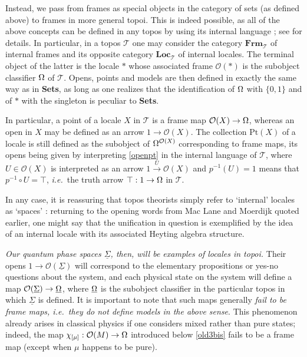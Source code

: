 \documentclass[11pt]{article}
\newcommand{\Sets}{\mbox{\textbf{Sets}}}
\newcommand{\raw}{\rightarrow} \newcommand{\rat}{\mapsto}
\newcommand{\inv}{^{-1}}
\newcommand{\er}{\eqref}
\newcommand{\ch}{\chi} \newcommand{\ps}{\psi} \newcommand{\Ps}{\Psi}
\newcommand{\CO}{{\mathcal O}} \newcommand{\CP}{{\mathcal P}}
\newcommand{\CT}{{\mathcal T}} \newcommand{\CV}{{\mathcal V}}
\newcommand{\functor}[1]{\ensuremath{\underline{#1}}}
\newcommand{\ie}{\textit{i.e.}}
\newcommand{\ulS}{\functor{\Sigma}}
\begin{document}
 Instead, we
 pass from frames as special objects in the category of sets (as defined above)
to frames in more general topoi. This is indeed possible, as all of the above
concepts
 can be defined in any topos by using its internal
 language \cite{maclanemoerdijk92}; see \cite{borceux3} for details. In
particular,
 in a topos $\CT$ one may consider the category $\mathbf{Frm}_{\CT}$ of internal
frames
 and its opposite category $\mathbf{Loc}_{\CT}$ of internal locales. The
terminal object of the latter is the locale $*$ whose associated frame $\CO(*)$
is the subobject classifier $\Omega$ of $\CT$. Opens, points and models are then
defined in exactly the same way as in \Sets, as long as one realizes that the
identification of $\Omega$ with $\{0,1\}$ and of $*$ with the singleton
 is peculiar to \Sets.

In particular, a point of a locale $X$ in $\CT$ is a frame map $\CO(X)\raw\Om$,
whereas an open in $X$ may be defined as an arrow $1\raw \CO(X)$.
 The collection $\mathrm{Pt}(X)$ of a locale is still defined as the subobject
of
$\Om^{\CO(X)}$ corresponding to frame maps, its opens being given by
interpreting \er{openpt} in the internal language of $\CT$, where $U\in \CO(X)$
is interpreted as an arrow $1\stackrel{U}{\raw}\CO(X)$
and $p\inv(U)=1$ means that $p\inv \circ U=\top$, \ie\ the truth arrow
$\top:1\raw\Om$ in $\CT$.

In any case, it is reassuring that topos theorists simply refer to `internal'
locales as `spaces' \cite{joyalmoerdijk90, joyaltierney84,moerdijk84}: returning
to the opening words
from Mac Lane and Moerdijk quoted earlier, one might say that the unification in
question
is exemplified by the idea of an internal locale with its associated Heyting
algebra structure.

{\it Our quantum phase spaces $\ulS$, then, will be examples of locales in
topoi.}
Their opens $1\raw \CO(\ulS)$ will correspond to the elementary propositions or
yes-no questions about the system, and each physical state on the system will
define a map
$\CO(\ulS)\raw \underline{\Om}$, where $\underline{\Omega}$ is the subobject
classifier in the particular topos in which $\ulS$ is defined.
It is important to note that such maps generally {\it  fail to be
frame maps, \ie\ they do not define models in the above sense}.
This phenomenon already arises in classical physics if one considers mixed
rather than pure states; indeed, the map
$\ch_{[\mu]}:\CO(M)\raw\Om$ introduced below \er{old3bis} fails to be a frame
map (except when $\mu$ happens to be pure).
\end{document}
